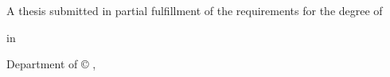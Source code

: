 \begin{titlepage}
	\centering
	\begin{doublespace}
		{\LARGE\bfseries\thetitle}
	\end{doublespace}
	\vfill
	{\Large\bfseries\theauthor}
	\vfill
	{\large{A thesis submitted in partial fulfillment of the requirements for the degree of}}
	\vfill
	{\Large\MyDegree\par}
	{\large in\par}
	{\Large\MySpecialization}
	\vfill
	{\Large{Department of \MyDepartment}}
	\vfill
	{\large\MyUniversity}
	\vfill
	{\large\copyright{} \theauthor, \MyYear}
\end{titlepage}
